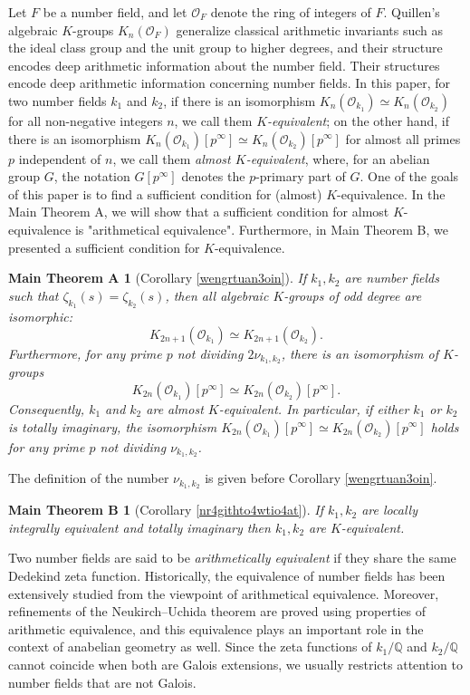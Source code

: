 \documentclass{article}
\numberwithin{equation}{section} %
\newtheorem*{mtA}{Main Theorem A}
\newtheorem*{mtB}{Main Theorem B}
\begin{document}
    Let $F$ be a number field, and let $\mathcal{O}_F$ denote the ring of integers of $F$. Quillen’s algebraic $K$-groups ${K_n(\mathcal{O}_F)}$ generalize classical arithmetic invariants such as the ideal class group and the unit group to higher degrees, and their structure encodes deep arithmetic information about the number field. Their structures encode deep arithmetic information concerning number fields. In this paper, for two number fields $k_1$ and $k_2$, if there is an isomorphism $K_n(\mathcal{O}_{k_1}) \simeq K_n(\mathcal{O}_{k_2})$ for all non-negative integers $n$, we call them \textit{$K$-equivalent}; on the other hand, if there is an isomorphism $K_n(\mathcal{O}_{k_1})[p^\infty] \simeq K_n(\mathcal{O}_{k_2})[p^\infty]$ for almost all primes $p$ independent of $n$, we call them \textit{almost $K$-equivalent}, where, for an abelian group $G$, the notation $G[p^\infty]$ denotes the $p$-primary part of $G$. One of the goals of this paper is to find a sufficient condition for (almost) $K$-equivalence. In the Main Theorem A, we will show that a sufficient condition for almost $K$-equivalence is "arithmetical equivalence". Furthermore, in Main Theorem B, we presented a sufficient condition for $K$-equivalence.

    \begin{mtA}[Corollary \ref{wengrtuan3oin}]
        If $k_1, k_2$ are number fields such that $\zeta_{k_1}(s) = \zeta_{k_2}(s)$, then all algebraic $K$-groups of odd degree are isomorphic:
  \[
    K_{2n+1}(\mathcal{O}_{k_1}) \simeq K_{2n+1}(\mathcal{O}_{k_2}).
  \]
  Furthermore, for any prime $p$ not dividing $2\nu_{k_1,k_2}$, there is an isomorphism of $K$-groups
  \[
    K_{2n}(\mathcal{O}_{k_1})[p^\infty] \simeq K_{2n}(\mathcal{O}_{k_2})[p^\infty].
  \]
  Consequently, $k_1$ and $k_2$ are almost $K$-equivalent. In particular, if either $k_1$ or $k_2$ is totally imaginary, the isomorphism $K_{2n}(\mathcal{O}_{k_1})[p^\infty] \simeq K_{2n}(\mathcal{O}_{k_2})[p^\infty]$ holds for any prime $p$ not dividing $\nu_{k_1,k_2}$.
    \end{mtA}

    The definition of the number $\nu_{k_1,k_2}$ is given  before Corollary \ref{wengrtuan3oin}.

    \begin{mtB}[Corollary \ref{nr4githto4wtio4at}]
        If $k_1,k_2$ are locally integrally equivalent and totally imaginary then $k_1,k_2$ are $K$-equivalent. 
    \end{mtB}

Two number fields are said to be \textit{arithmetically equivalent} if they share the same Dedekind zeta function. Historically, the equivalence of number fields has been extensively studied from the viewpoint of arithmetical equivalence. Moreover, refinements of the Neukirch–Uchida theorem are proved using properties of arithmetic equivalence, and this equivalence plays an important role in the context of anabelian geometry as well. Since the zeta functions of $k_1/\mathbb{Q}$ and $k_2/\mathbb{Q}$ cannot coincide when both are Galois extensions, we usually restricts attention to number fields that are not Galois.
\end{document}
